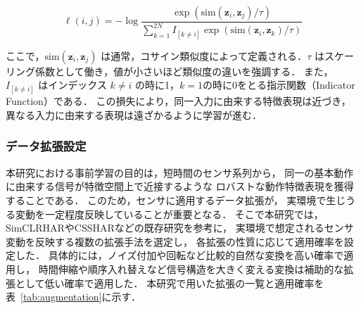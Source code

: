 \documentclass[submit]{ipsj}
\newcommand{\rev}[1]{{\color{red}#1}}
\begin{document}
{\begin{equation}
  \ell(i, j) = -\log \frac{\exp\left( \mathrm{sim}(\mathbf{z}_i, \mathbf{z}_j) / \tau \right)}{\sum_{k=1}^{2N} I_{[k \ne i]} \exp\left( \mathrm{sim}(\mathbf{z}_i, \mathbf{z}_k) / \tau \right)}
\end{equation}

  
ここで，$\mathrm{sim}(\mathbf{z}_i, \mathbf{z}_j)$ は通常，コサイン類似度によって定義される．$\tau$ はスケーリング係数として働き，値が小さいほど類似度の違いを強調する．
また，$I_{[k \ne i]}$ はインデックス $k \ne i$ の時に1，$k=1$の時に0をとる指示関数（Indicator Function）である．
\rev{この損失により，同一入力に由来する特徴表現は近づき，
異なる入力に由来する表現は遠ざかるように学習が進む．}

\subsubsection{データ拡張設定}
本研究における事前学習の目的は，短時間のセンサ系列から，
同一の基本動作に由来する信号が特徴空間上で近接するような
ロバストな動作特徴表現を獲得することである．
このため，センサに適用するデータ拡張が，
実環境で生じうる変動を一定程度反映していることが重要となる．
\rev{そこで本研究では，SimCLRHAR\cite{tang2020exploring}やCSSHAR\cite{khaertdinov2021contrastive}などの既存研究を参考に，
実環境で想定されるセンサ変動を反映する複数の拡張手法を選定し，
各拡張の性質に応じて適用確率を設定した．
具体的には，ノイズ付加や回転など比較的自然な変換を高い確率で適用し，
時間伸縮や順序入れ替えなど信号構造を大きく変える変換は補助的な拡張として低い確率で適用した．}
本研究で用いた拡張の一覧と適用確率を表~\ref{tab:augmentation}に示す．


}
\end{document}
